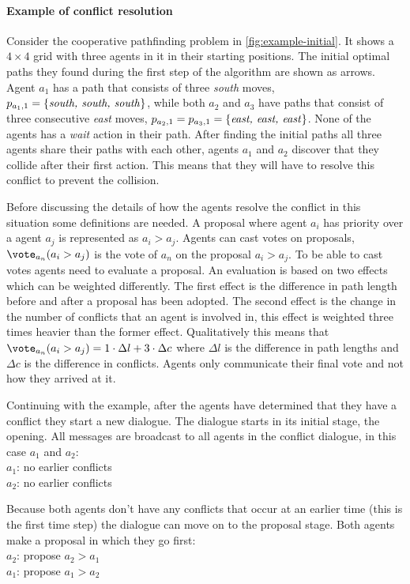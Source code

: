 \paragraph{Example of conflict resolution} Consider the cooperative pathfinding
problem in \autoref{fig:example-initial}. It shows a $4 \times 4$ grid with
three agents in it in their starting positions. The initial optimal paths they
found during the first step of the algorithm are shown as arrows.
Agent $a_1$ has a path that consists of three \emph{south} moves, $p_{a_{1},1}
= \{\text{\emph{south, south, south}}\}$, while both $a_2$ and $a_3$ have paths
that consist of three consecutive \emph{east} moves, $p_{a_2,1} = p_{a_3,1} =
\{\text{\emph{east, east, east}}\}$. None of the agents has a \emph{wait}
action in their path. After finding the initial paths all three agents share
their paths with each other, agents $a_1$ and $a_2$ discover that they collide
after their first action. This means that they will have to resolve this
conflict to prevent the collision.

Before discussing the details of how the agents resolve the conflict in this
situation some definitions are needed. A proposal where agent $a_i$ has
priority over a agent $a_j$ is represented as $a_i > a_j$. Agents can cast
votes on proposals, $\vote_{a_n}(a_i > a_j)$ is the vote of $a_n$ on the
proposal $a_i > a_j$. To be able to cast votes agents need to evaluate a
proposal. An evaluation  is based on two effects which can be weighted
differently. The first effect is the difference in path length before and after
a proposal has been adopted. The second effect is the change in the number of
conflicts that an agent is involved in, this effect is weighted three times
heavier than the former effect. Qualitatively this means that $\vote_{a_n}(a_i
> a_j) = 1 \cdot \Delta l + 3 \cdot \Delta c$ where $\Delta l$ is the
difference in path lengths and $\Delta c$ is the difference in conflicts.
Agents only communicate their final vote and not how they arrived at it.

Continuing with the example, after the agents have determined that they have a
conflict they start a new dialogue. The dialogue starts in its initial stage,
the opening. All messages are broadcast to all agents in the conflict dialogue,
in this case $a_1$ and $a_2$:
\\ \-\qquad $a_1$: no earlier conflicts
\\ \-\qquad $a_2$: no earlier conflicts

Because both agents don't have any conflicts that occur at an earlier time
(this is the first time step) the dialogue can move on to the proposal stage.
Both agents make a proposal in which they go first:
\\ \-\qquad $a_2$: propose $a_2 > a_1$
\\ \-\qquad $a_1$: propose $a_1 > a_2$


